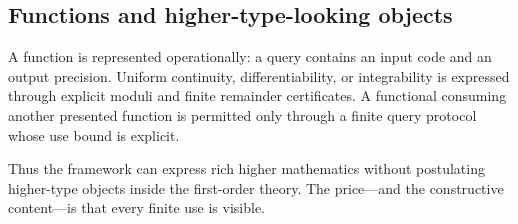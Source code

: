 \subsection{Functions and higher-type-looking objects}

A function is represented operationally: a query contains an input code and an
output precision.  Uniform continuity, differentiability, or integrability is
expressed through explicit moduli and finite remainder certificates.  A
functional consuming another presented function is permitted only through a
finite query protocol whose use bound is explicit.

Thus the framework can express rich higher mathematics without postulating
higher-type objects inside the first-order theory.  The price---and the
constructive content---is that every finite use is visible.
